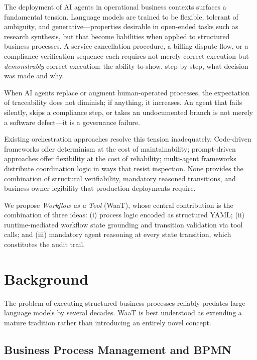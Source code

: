 \documentclass[10pt,conference]{IEEEtran}
\begin{document}
The deployment of AI agents in operational business contexts
surfaces a fundamental tension.  Language models are trained to be
flexible, tolerant of ambiguity, and generative---properties
desirable in open-ended tasks such as research synthesis, but that
become liabilities when applied to structured business processes.
A service cancellation procedure, a billing dispute flow, or a
compliance verification sequence each requires not merely correct
execution but \emph{demonstrably} correct execution: the ability
to show, step by step, what decision was made and why.

When AI agents replace or augment human-operated processes, the
expectation of traceability does not diminish; if anything, it
increases.  An agent that fails silently, skips a compliance step,
or takes an undocumented branch is not merely a software
defect---it is a governance failure.

Existing orchestration approaches resolve this tension
inadequately.  Code-driven frameworks offer determinism at the
cost of maintainability; prompt-driven approaches offer flexibility
at the cost of reliability; multi-agent frameworks distribute
coordination logic in ways that resist inspection.  None provides
the combination of structural verifiability, mandatory reasoned
transitions, and business-owner legibility that production
deployments require.

We propose \emph{Workflow as a Tool} (WaaT), whose central
contribution is the combination of three ideas: (i) process logic
encoded as structured YAML; (ii) runtime-mediated workflow state
grounding and transition validation via tool calls; and (iii)
mandatory agent reasoning at every state transition, which
constitutes the audit trail.


\section{Background}
\label{sec:background}

The problem of executing structured business processes reliably
predates large language models by several decades.  WaaT is best
understood as extending a mature tradition rather than introducing
an entirely novel concept.

\subsection{Business Process Management and BPMN}
\end{document}
